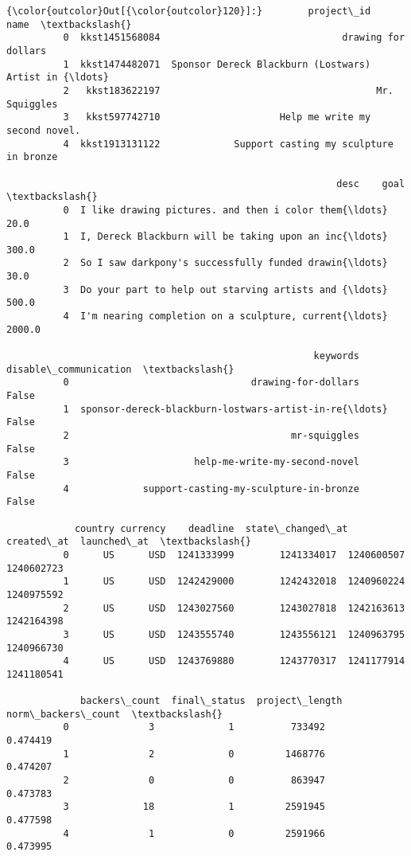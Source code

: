 \documentclass[11pt]{article}
\begin{document}
\begin{Verbatim}[commandchars=\\\{\}]
{\color{outcolor}Out[{\color{outcolor}120}]:}        project\_id                                               name  \textbackslash{}
          0  kkst1451568084                                drawing for dollars   
          1  kkst1474482071  Sponsor Dereck Blackburn (Lostwars) Artist in {\ldots}   
          2   kkst183622197                                      Mr. Squiggles   
          3   kkst597742710                     Help me write my second novel.   
          4  kkst1913131122             Support casting my sculpture in bronze   
          
                                                          desc    goal  \textbackslash{}
          0  I like drawing pictures. and then i color them{\ldots}    20.0   
          1  I, Dereck Blackburn will be taking upon an inc{\ldots}   300.0   
          2  So I saw darkpony's successfully funded drawin{\ldots}    30.0   
          3  Do your part to help out starving artists and {\ldots}   500.0   
          4  I'm nearing completion on a sculpture, current{\ldots}  2000.0   
          
                                                      keywords  disable\_communication  \textbackslash{}
          0                                drawing-for-dollars                  False   
          1  sponsor-dereck-blackburn-lostwars-artist-in-re{\ldots}                  False   
          2                                       mr-squiggles                  False   
          3                      help-me-write-my-second-novel                  False   
          4             support-casting-my-sculpture-in-bronze                  False   
          
            country currency    deadline  state\_changed\_at  created\_at  launched\_at  \textbackslash{}
          0      US      USD  1241333999        1241334017  1240600507   1240602723   
          1      US      USD  1242429000        1242432018  1240960224   1240975592   
          2      US      USD  1243027560        1243027818  1242163613   1242164398   
          3      US      USD  1243555740        1243556121  1240963795   1240966730   
          4      US      USD  1243769880        1243770317  1241177914   1241180541   
          
             backers\_count  final\_status  project\_length  norm\_backers\_count  \textbackslash{}
          0              3             1          733492            0.474419   
          1              2             0         1468776            0.474207   
          2              0             0          863947            0.473783   
          3             18             1         2591945            0.477598   
          4              1             0         2591966            0.473995   
          

\end{Verbatim}
\end{document}
